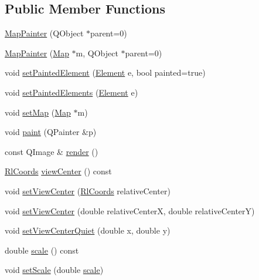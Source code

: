 \subsection*{\-Public \-Member \-Functions}
\begin{DoxyCompactItemize}
\item 
\hyperlink{class_map_painter_a9c1c9ee90336daa528e090334ef67a39}{\-Map\-Painter} (\-Q\-Object $\ast$parent=0)
\item 
\hyperlink{class_map_painter_a6d282b26150b3d5b592f307f09b29e4c}{\-Map\-Painter} (\hyperlink{class_map}{\-Map} $\ast$m, \-Q\-Object $\ast$parent=0)
\item 
void \hyperlink{class_map_painter_a8e7486d3743d62d2f3d334c23d38e1c9}{set\-Painted\-Element} (\hyperlink{class_map_painter_a771b3fa246b6c13cc2acbdcf1cb6eee3}{\-Element} e, bool painted=true)
\item 
void \hyperlink{class_map_painter_aaf546a511fb08c1688ce06392bce1048}{set\-Painted\-Elements} (\hyperlink{class_map_painter_a771b3fa246b6c13cc2acbdcf1cb6eee3}{\-Element} e)
\item 
void \hyperlink{class_map_painter_a2b1aa596498e0c01c0b53d06d4a598b4}{set\-Map} (\hyperlink{class_map}{\-Map} $\ast$m)
\item 
void \hyperlink{class_map_painter_a0deb552b94eff8f8751946928d7cd5b8}{paint} (\-Q\-Painter \&p)
\item 
const \-Q\-Image \& \hyperlink{class_map_painter_a1c20cf03d0376290481bd80b9f8ef013}{render} ()
\item 
\hyperlink{class_rl_coords}{\-Rl\-Coords} \hyperlink{class_map_painter_acbc0aeb056ee078b0053bf8fb183b36e}{view\-Center} () const 
\item 
void \hyperlink{class_map_painter_a435c535da8087a54ba09c71232377508}{set\-View\-Center} (\hyperlink{class_rl_coords}{\-Rl\-Coords} relative\-Center)
\item 
void \hyperlink{class_map_painter_ae840a2addecd404598ec8300bbd4870f}{set\-View\-Center} (double relative\-Center\-X, double relative\-Center\-Y)
\item 
void \hyperlink{class_map_painter_a5da86b2c104c9d22eb54ecd7b1d0b960}{set\-View\-Center\-Quiet} (double x, double y)
\item 
double \hyperlink{class_map_painter_ae006f2db1575f588b5f94691e9f34970}{scale} () const 
\item 
void \hyperlink{class_map_painter_ae1d7e11835d4ee6588c5b5f0429787e3}{set\-Scale} (double \hyperlink{class_map_painter_ae006f2db1575f588b5f94691e9f34970}{scale})
\item 

\end{DoxyCompactItemize}
